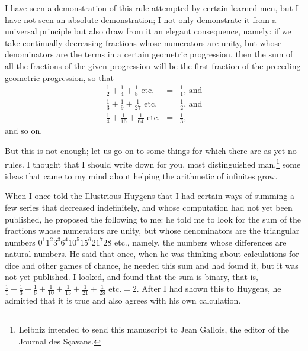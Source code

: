 \documentclass[polutonikogreek,english,twoside,openright]{article}
\newlength{\oldjot}
\begin{document}
I have seen a demonstration of this rule attempted by certain learned men, but
I have not seen an absolute demonstration; I not only demonstrate it from a universal principle but
also draw from it
    an elegant consequence, namely: if we take continually decreasing
    fractions whose numerators are unity, but whose denominators are the terms
    in a certain geometric progression, then the sum of all the fractions of
    the given progression will be the first fraction of the preceding
    geometric progression, so that
\setlength{\jot}{2ex}
\begin{eqnarray*}
\frac{1}{2} + \frac{1}{4} + \frac{1}{8} \mbox{ etc.} & = & \frac{1}{1}\mbox{, and}\\
\frac{1}{3} + \frac{1}{9} + \frac{1}{27} \mbox{ etc.} & = & \frac{1}{2}\mbox{, and}\\
\frac{1}{4} + \frac{1}{16} + \frac{1}{64} \mbox{ etc.} &  = & \frac{1}{3},
\end{eqnarray*}
\setlength{\jot}{\oldjot}
 and so on.

But this is not enough; let us go on to some things for which there are as yet
no rules.  I thought that I should write down for you, most distinguished
man,\footnote{Leibniz intended to send this manuscript to Jean Gallois, the editor of the Journal des S\c{c}avans.} some ideas that came to my mind about
helping the arithmetic of infinites grow.

\label{beghar} When I once told the Illustrious Huygens that I had certain ways of summing a
few series that decreased indefinitely, and whose computation had not yet been
published, he proposed the following to me: he told me to look for the sum of
the fractions whose numerators are unity, but whose denominators are the
triangular numbers $0^1 1^2 3^3 6^4 10^5 15^6 21^7 28$ etc., namely, the numbers
whose differences are natural numbers.  He said that once, when he was
thinking about calculations for dice and other games of chance, he needed this
sum and had found it, but it was not yet published.  I looked, and found that
the sum is binary, that is, $\frac{1}{1} + \frac{1}{3} + \frac{1}{6} +
\frac{1}{10} +\frac{1}{15} + \frac{1}{21} +\frac{1}{28} \mbox{ etc.} = 2.$
After I had shown this to Huygens, he admitted that it is true and also agrees
with his own calculation.
\end{document}

